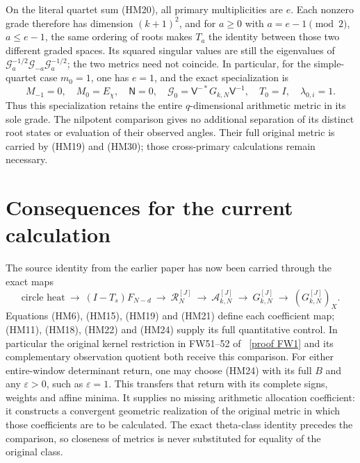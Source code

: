\documentclass[11pt]{article}
\begin{document}
On the literal quartet sum (HM20), all primary multiplicities are $e$.
Each nonzero grade therefore has dimension $(k+1)^2$, and for $a\ge0$
with $a=e-1\pmod2$, $a\le e-1$, the same ordering of roots makes
$T_a$ the identity between those two different graded spaces. Its
squared singular values are still the eigenvalues of
$\mathcal G_a^{-1/2}\mathcal G_{-a}\mathcal G_a^{-1/2}$; the two
metrics need not coincide. In particular, for the simple-quartet case
$m_0=1$, one has $e=1$, and the exact specialization is
\begin{equation}\tag{HM30}
 M_{-1}=0,\quad M_0=E_\chi,\quad \mathsf N=0,\quad
 \mathcal G_0=\mathsf V^{-*}G_{k,N}\mathsf V^{-1},\quad
 T_0=I,\quad\lambda_{0,i}=1.
\end{equation}
Thus this specialization retains the entire $q$-dimensional arithmetic
metric in its sole grade. The nilpotent comparison gives no additional
separation of its distinct root states or evaluation of their observed
angles. Their full original metric is carried by (HM19) and (HM30);
those cross-primary calculations remain necessary.

\section{Consequences for the current calculation}
The source identity from the earlier paper has now been carried through
the exact maps
\[
 \text{circle heat}\ \longrightarrow\ (I-T_s)F_{N-d}\
 \longrightarrow\ \mathcal R_N^{[J]}\
 \longrightarrow\ \mathcal A_{k,N}^{[J]}\
 \longrightarrow\ G_{k,N}^{[J]}\
 \longrightarrow\ (G_{k,N}^{[J]})_X.
\]
Equations (HM6), (HM15), (HM19) and (HM21) define each coefficient map;
(HM11), (HM18), (HM22) and (HM24) supply its full quantitative control.
In particular the original kernel restriction in FW51--52 of
\cite{fullwindow}%
~\href{https://github.com/KokunoYumeto/zeta-function-research-reader/blob/5992ad50c0f2a06921f1fcaded7b4e38097c0739/workbenches/splitzero-tandem/continuations/20260920-original-kernel-mixed-determinants/providers/FULL_WINDOW_SOURCE_PRODUCTS.tex\#L28}{[proof FW1]}%
{} and its complementary observation quotient both
receive this comparison. For either entire-window determinant return,
one may choose (HM24) with its full $B$ and any $\varepsilon>0$, such
as $\varepsilon=1$. This transfers that return with its complete signs,
weights and affine minima. It supplies no missing arithmetic allocation
coefficient: it constructs a convergent geometric realization of the
original metric in which those coefficients are to be calculated.
The exact theta-class identity precedes the comparison, so closeness of
metrics is never substituted for equality of the original class.
\end{document}
